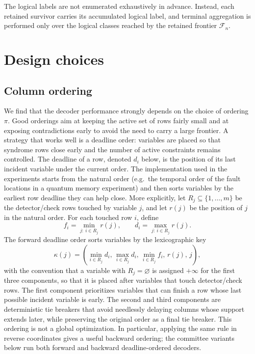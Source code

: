 \documentclass[a4paper,twocolumn,11pt,unpublished]{quantumarticle}
\begin{document}
The logical labels are not enumerated exhaustively in advance. Instead, each
retained survivor carries its accumulated logical label, and terminal
aggregation is performed only over the logical classes reached by the retained
frontier \(\mathcal F_n\).



\section{Design choices}
\label{sec:design}

\subsection{Column ordering}

We find that the decoder performance strongly depends on the choice of ordering $\pi$. Good orderings aim at keeping the active set of rows fairly small and at exposing contradictions early to avoid the need to carry a large frontier. A strategy that works well is a deadline order: variables are placed so that syndrome rows close early and the number of active constraints remains controlled.  The deadline of a row, denoted \(d_i\) below, is the position of its last incident variable under the current order.
The implementation used in the experiments starts from the natural order (e.g.~the temporal order of the fault locations in a quantum memory experiment) and then sorts variables by the earliest row deadline they can help close.  More explicitly, let \(R_j\subseteq\{1,\ldots,m\}\) be the detector/check rows touched by variable \(j\), and let \(r(j)\) be the position of \(j\) in the natural order.  For each touched row \(i\), define
\begin{equation}
    f_i=\min_{j:\ i\in R_j} r(j),
    \qquad
    d_i=\max_{j:\ i\in R_j} r(j).
\end{equation}
The forward deadline order sorts variables by the lexicographic key
\begin{equation}
    \kappa(j)=
    \left(
      \min_{i\in R_j} d_i,\,
      \max_{i\in R_j} d_i,\,
      \min_{i\in R_j} f_i,\,
      r(j),\,
      j
    \right),
    \label{eq:deadline_key}
\end{equation}
with the convention that a variable with \(R_j=\varnothing\) is assigned \(+\infty\) for the first three components, so that it is placed after variables that touch detector/check rows.  The first component prioritizes variables that can finish a row whose last possible incident variable is early.  The second and third components are deterministic tie breakers that avoid needlessly delaying columns whose support extends later, while preserving the original order as a final tie breaker.
This ordering is not a global optimization. In particular, applying the same rule in reverse coordinates gives a useful backward ordering; the committee variants below run both forward and backward deadline-ordered decoders.
\end{document}
